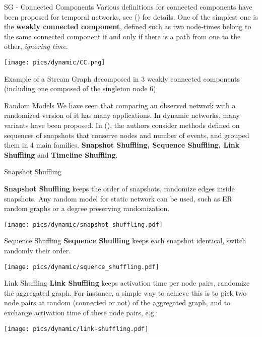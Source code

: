 \begin{textbox}{SG - Connected Components}
    Various definitions for connected components have been proposed for temporal networks, see  (\cite{latapy2018stream}) for details. One of the simplest one is the \textbf{weakly connected component}, defined such as two node-times belong to the same connected component if and only if there is a path from one to the other, \textit{ignoring time}.

    \centering
    \colorbox{white}{\texttt{[image: pics/dynamic/CC.png]}}

    Example of a Stream Graph decomposed in 3 weakly connected components (including one composed of the singleton node 6)
\end{textbox}


\begin{textbox}{Random Models}
    We have seen that comparing an observed network with a randomized version of it has many applications. In dynamic networks, many variants have been proposed. In (\cite{gauvin2022}), the authors consider methods defined on sequences of snapshots that conserve nodes and number of events, and grouped them in 4 main families, \textbf{Snapshot Shuffling, Sequence Shuffling, Link Shuffling} and \textbf{Timeline Shuffling}.
\end{textbox}


\begin{textbox}{Snapshot Shuffling}

    \textbf{Snapshot Shuffling} keeps the order of snapshots, randomize edges inside snapshots. Any random model for static network can be used, such as ER random graphs or a degree preserving randomization.

    \centering
    \colorbox{white}{\texttt{[image: pics/dynamic/snapshot\_shuffling.pdf]}}
\end{textbox}


\begin{textbox}{Sequence Shuffling}
    \textbf{Sequence Shuffling} keeps each snapshot identical, switch randomly their order.

    \centering
    \colorbox{white}{\texttt{[image: pics/dynamic/squence\_shuffling.pdf]}}
\end{textbox}

\begin{textbox}{Link Shuffling}
    \textbf{Link Shuffling} keeps activation time per node pairs, randomize the aggregated graph. For instance, a simple way to achieve this is to pick two node pairs at random (connected or not) of the aggregated graph, and to exchange activation time of these node pairs, e.g.:


    \centering
    \colorbox{white}{\texttt{[image: pics/dynamic/link-shuffling.pdf]}}
\end{textbox}


